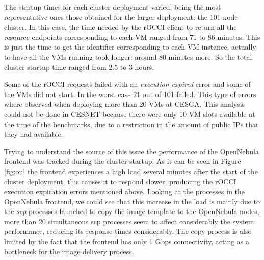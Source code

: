 
The startup times for each cluster deployment varied, being the most representative ones those obtained for the larger deployment: the 101-node cluster. In this case, the time needed by the rOCCI client to return all the resource endpoints corresponding to each VM ranged from 71 to 86 minutes. This is just the time to get the identifier corresponding to each VM instance, actually to have all the VMs running took longer: around 80 minutes more. So the total cluster startup time ranged from 2.5 to 3 hours. 

Some of the rOCCI requests failed with an \emph{execution expired} error and some of the VMs did not start. In the worst case 21 out of 101 failed.
This type of errors where observed when deploying more than 20 VMs at CESGA. This analysis could not be done in CESNET because there were only 10 VM slots available at the time of the benchmarks, due to a restriction in the amount of public IPs that they had available.

Trying to understand the source of this issue the performance of the OpenNebula frontend was tracked during the cluster startup. As it can be seen in Figure \ref{fig:on} the frontend experiences a high load several minutes after the start of the cluster deployment, this causes it to respond slower, producing the rOCCI execution expiration errors mentioned above. Looking at the processes in the OpenNebula frontend, we could see that this increase in the load is mainly due to the \emph{scp} processes launched to copy the image template to the OpenNebula nodes, more than 20 simultaneous scp processes seem to affect considerably the system performance, reducing its response times considerably. The copy process is also limited by the fact that the frontend has only 1 Gbps connectivity, acting as a bottleneck for the image delivery process.

%
%
%
%

